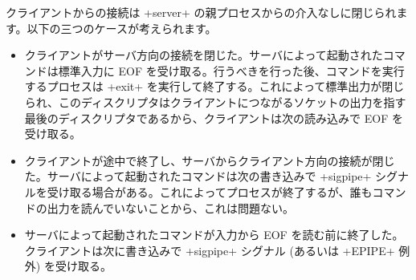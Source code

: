 クライアントからの接続は \ml+server+ の親プロセスからの介入なしに閉じられます。以下の三つのケースが考えられます。

\begin{itemize}
\item クライアントがサーバ方向の接続を閉じた。サーバによって起動されたコマンドは標準入力に EOF を受け取る。行うべきを行った後、コマンドを実行するプロセスは \ml+exit+ を実行して終了する。これによって標準出力が閉じられ、このディスクリプタはクライアントにつながるソケットの出力を指す最後のディスクリプタであるから、クライアントは次の読み込みで EOF を受け取る。

\item クライアントが途中で終了し、サーバからクライアント方向の接続が閉じた。サーバによって起動されたコマンドは次の書き込みで \ml+sigpipe+ シグナルを受け取る場合がある。これによってプロセスが終了するが、誰もコマンドの出力を読んでいないことから、これは問題ない。

\item サーバによって起動されたコマンドが入力から EOF を読む前に終了した。クライアントは次に書き込みで \ml+sigpipe+ シグナル (あるいは \ml+EPIPE+ 例外) を受け取る。
\end{itemize}

